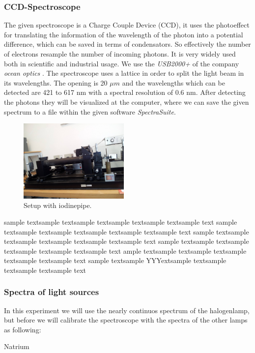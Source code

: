 \subsubsection{CCD-Spectroscope}
The given spectroscope is a Charge Couple Device (CCD), it uses
the photoeffect for translating the information of the wavelength
of the photon into a potential difference, which can be saved
in terms of condensators. So effectively the number of electrons
resample the number of incoming photons. It is very widely used
both in scientific and industrial usage.
We use the \textit{USB2000+} of the company \textit{ocean optics}
\cite{versuchsanleitung}. The spectroscope uses a lattice in order
to split the light beam in its wavelengths. 
The opening is 20 $\mu m$ and the wavelengths which can be
detected are 421 to 617 nm with a spectral resolution of 0.6 nm.
After detecting 
the photons they will be visualized at the computer, where we
can save the given spectrum to a file within the given software
\textit{SpectraSuite}.
\begin{figure}
\caption{Setup with iodinepipe.} 
  \begin{center}
    \includegraphics[width=0.48\textwidth]{pics/const2}
  \end{center}
 \label{fig:const2}
  \vspace{+10pt}
\end{figure}

sample textsample textsample textsample textsample textsample text
sample textsample textsample textsample textsample textsample text
sample textsample textsample textsample textsample textsample text
sample textsample textsample textsample textsample textsample text
ample textsample textsample textsample textsample textsample text
sample textsample YYYextsample textsample textsample textsample text
\subsubsection{Spectra of light sources}
In this experiment we will use the nearly continuos spectrum of
the halogenlamp, but before we will calibrate the spectroscope
with the spectra of the other lamps as following:
\par
Natrium 


